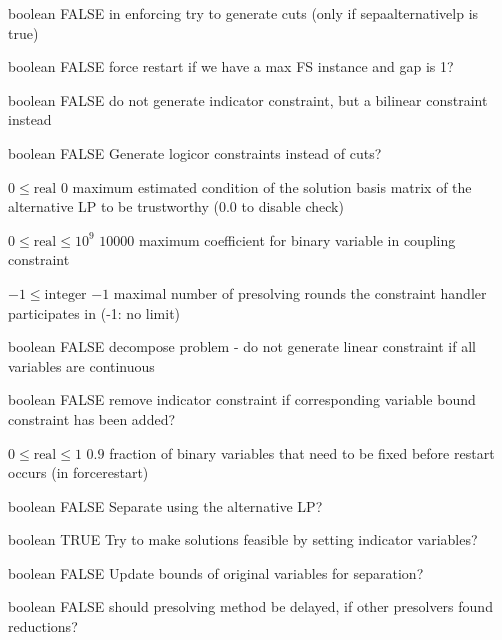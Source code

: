 %
{boolean}%
{FALSE}%
{in enforcing try to generate cuts (only if sepaalternativelp is true)}%
{}

%
{boolean}%
{FALSE}%
{force restart if we have a max FS instance and gap is 1?}%
{}

%
{boolean}%
{FALSE}%
{do not generate indicator constraint, but a bilinear constraint instead}%
{}

%
{boolean}%
{FALSE}%
{Generate logicor constraints instead of cuts?}%
{}

%
{$0\leq\textrm{real}$}%
{$0$}%
{maximum estimated condition of the solution basis matrix of the alternative LP to be trustworthy (0.0 to disable check)}%
{}

%
{$0\leq\textrm{real}\leq10^{  9}$}%
{$10000$}%
{maximum coefficient for binary variable in coupling constraint}%
{}

%
{$-1\leq\textrm{integer}$}%
{$-1$}%
{maximal number of presolving rounds the constraint handler participates in (-1: no limit)}%
{}

%
{boolean}%
{FALSE}%
{decompose problem - do not generate linear constraint if all variables are continuous}%
{}

%
{boolean}%
{FALSE}%
{remove indicator constraint if corresponding variable bound constraint has been added?}%
{}

%
{$0\leq\textrm{real}\leq1$}%
{$0.9$}%
{fraction of binary variables that need to be fixed before restart occurs (in forcerestart)}%
{}

%
{boolean}%
{FALSE}%
{Separate using the alternative LP?}%
{}

%
{boolean}%
{TRUE}%
{Try to make solutions feasible by setting indicator variables?}%
{}

%
{boolean}%
{FALSE}%
{Update bounds of original variables for separation?}%
{}

%
{boolean}%
{FALSE}%
{should presolving method be delayed, if other presolvers found reductions?}%
{}

